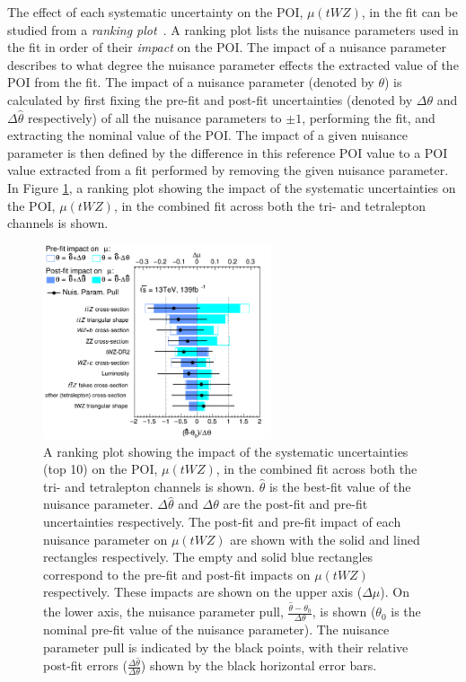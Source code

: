 The effect of each systematic uncertainty on the POI, $\mu (tWZ)$, in the fit can be studied from a \textit{ranking plot}~\cite{stats-at-atlas-cms-slides}. A ranking plot lists the nuisance parameters used in the fit in order of their \textit{impact} on the POI. The impact of a nuisance parameter describes to what degree the nuisance parameter effects the extracted value of the POI from the fit. The impact of a nuisance parameter (denoted by $\theta$) is calculated by first fixing the pre-fit and post-fit uncertainties (denoted by $\Delta \theta$ and $\Delta \hat{\theta}$ respectively) of all the nuisance parameters to $\pm 1$, performing the fit, and extracting the nominal value of the POI. The impact of a given nuisance parameter is then defined by the difference in this reference POI value to a POI value extracted from a fit performed by removing the given nuisance parameter. In Figure \ref{fig:4lep-combined-nuisance-ranking}, a ranking plot showing the impact of the systematic uncertainties on the POI, $\mu (tWZ)$, in the combined fit across both the tri- and tetralepton channels is shown.
\begin{figure}[h!]
    \centering
    \includegraphics[width=0.6\textwidth]{figures/combined/RankingSysts_SigXsecOverSM_systs.png}
    \caption{A ranking plot showing the impact of the systematic uncertainties (top 10) on the POI, $\mu (tWZ)$, in the combined fit across both the tri- and tetralepton channels is shown. $\hat{\theta}$ is the best-fit value of the nuisance parameter. $\Delta \hat{\theta}$ and $\Delta\theta$ are the post-fit and pre-fit uncertainties respectively. The post-fit and pre-fit impact of each nuisance parameter on $\mu (tWZ)$ are shown with the solid and lined rectangles respectively. The empty and solid blue rectangles correspond to the pre-fit and post-fit impacts on $\mu (tWZ)$ respectively. These impacts are shown on the upper axis ($\Delta \mu$). On the lower axis, the nuisance parameter pull, $\frac{\hat{\theta} - \theta_{0}}{\Delta{\theta}}$, is shown ($\theta_{0}$ is the nominal pre-fit value of the nuisance parameter). The nuisance parameter pull is indicated by the black points, with their relative post-fit errors ($\frac{\Delta \hat{\theta}}{\Delta \theta}$) shown by the black horizontal error bars.}
    \label{fig:4lep-combined-nuisance-ranking}
\end{figure}

